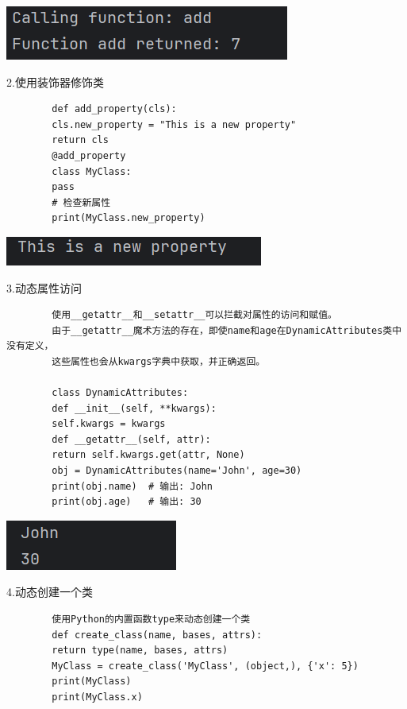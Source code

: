 \documentclass{article}
\begin{document}
	\begin{minipage}{\linewidth}
		\centering
		\includegraphics[width=0.5\linewidth]{example4.png}
		\label{fig:example}
	\end{minipage}
	
	2.使用装饰器修饰类
	\begin{verbatim}
		def add_property(cls):
		cls.new_property = "This is a new property"
		return cls
		@add_property
		class MyClass:
		pass
		# 检查新属性
		print(MyClass.new_property)
	\end{verbatim}

	\noindent
	\begin{minipage}{\linewidth}
		\centering
		\includegraphics[width=0.5\linewidth]{example5.png}
		\label{fig:example}
	\end{minipage}
	
	3.动态属性访问
	\begin{verbatim}
		使用__getattr__和__setattr__可以拦截对属性的访问和赋值。
		由于__getattr__魔术方法的存在，即使name和age在DynamicAttributes类中没有定义，
		这些属性也会从kwargs字典中获取，并正确返回。
		
		class DynamicAttributes:
		def __init__(self, **kwargs):
		self.kwargs = kwargs
		def __getattr__(self, attr):
		return self.kwargs.get(attr, None)
		obj = DynamicAttributes(name='John', age=30)
		print(obj.name)  # 输出: John
		print(obj.age)   # 输出: 30
	\end{verbatim}
	
	\noindent
	\begin{minipage}{\linewidth}
		\centering
		\includegraphics[width=0.5\linewidth]{example6.png}
		\label{fig:example}
	\end{minipage}
	
	4.动态创建一个类
	\begin{verbatim} 
		使用Python的内置函数type来动态创建一个类
		def create_class(name, bases, attrs):
		return type(name, bases, attrs)
		MyClass = create_class('MyClass', (object,), {'x': 5})
		print(MyClass)
		print(MyClass.x)
	\end{verbatim}
	
\end{document}

